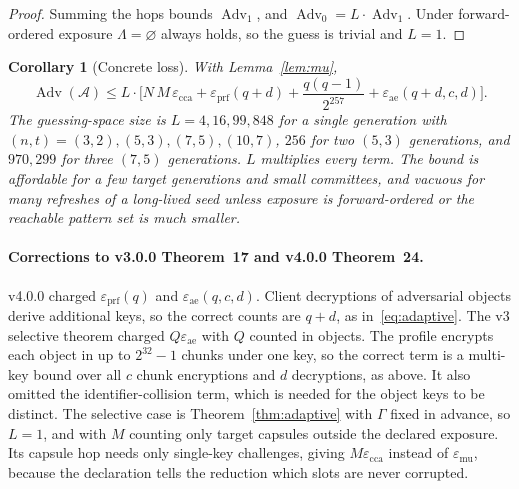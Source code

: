 \documentclass[pdflatex,sn-mathphys-num]{sn-jnl}
\theoremstyle{plain}
\newtheorem{corollary}[theorem]{Corollary}
\theoremstyle{definition}
\newcommand{\Adv}{\operatorname{Adv}}
\begin{document}
\begin{proof}
Summing the hops bounds $\Adv_1$, and $\Adv_0=L\cdot\Adv_1$. Under forward-ordered exposure $\Lambda=\varnothing$ always holds, so the guess is trivial and $L=1$.
\end{proof}

\begin{corollary}[Concrete loss]\label{cor:loss}
With Lemma~\ref{lem:mu},
\[
 \Adv(\mathcal A)\le L\cdot\Big[N\,M\,\varepsilon_{\mathrm{cca}}+\varepsilon_{\mathrm{prf}}(q+d)+\frac{q(q-1)}{2^{257}}+\varepsilon_{\mathrm{ae}}(q+d,c,d)\Big].
\]
The guessing-space size is $L=4,16,99,848$ for a single generation with $(n,t)=(3,2),(5,3),(7,5),(10,7)$, $256$ for two $(5,3)$ generations, and $970{,}299$ for three $(7,5)$ generations. $L$ multiplies every term. The bound is affordable for a few target generations and small committees, and vacuous for many refreshes of a long-lived seed unless exposure is forward-ordered or the reachable pattern set is much smaller.
\end{corollary}

\paragraph{Corrections to v3.0.0 Theorem~17 and v4.0.0 Theorem~24.}
v4.0.0 charged $\varepsilon_{\mathrm{prf}}(q)$ and $\varepsilon_{\mathrm{ae}}(q,c,d)$. Client decryptions of adversarial objects derive additional keys, so the correct counts are $q+d$, as in~\eqref{eq:adaptive}. The v3 selective theorem charged $Q\varepsilon_{\mathrm{ae}}$ with $Q$ counted in objects. The profile encrypts each object in up to $2^{32}-1$ chunks under one key, so the correct term is a multi-key bound over all $c$ chunk encryptions and $d$ decryptions, as above. It also omitted the identifier-collision term, which is needed for the object keys to be distinct. The selective case is Theorem~\ref{thm:adaptive} with $\Gamma$ fixed in advance, so $L=1$, and with $M$ counting only target capsules outside the declared exposure. Its capsule hop needs only single-key challenges, giving $M\varepsilon_{\mathrm{cca}}$ instead of $\varepsilon_{\mathrm{mu}}$, because the declaration tells the reduction which slots are never corrupted.
\end{document}
